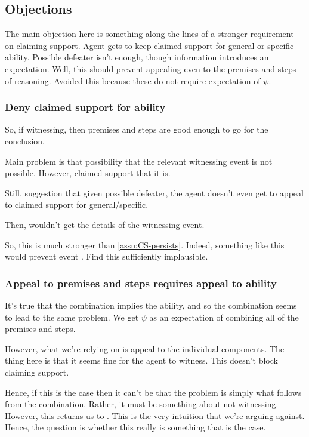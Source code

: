 \subsection{Objections}

\begin{note}
  The main objection here is something along the lines of a stronger requirement on claiming support.
  Agent gets to keep claimed support for general or specific ability.
  Possible defeater isn't enough, though information introduces an expectation.
  Well, this should prevent appealing even to the premises and steps of reasoning.
  Avoided this because these do not require expectation of \(\psi\).
\end{note}

\subsubsection{Deny claimed support for ability}

\begin{note}
  So, if witnessing, then premises and steps are good enough to go for the conclusion.

  Main problem is that possibility that the relevant witnessing event is not possible.
  However, claimed support that it is.

  Still, suggestion that given possible defeater, the agent doesn't even get to appeal to claimed support for general/specific.

  Then, wouldn't get the details of the witnessing event.

  So, this is much stronger than \autoref{assu:CS-persists}.
  Indeed, something like this would prevent event \ESU{}.
  Find this sufficiently implausible.
\end{note}

\subsubsection{Appeal to premises and steps requires appeal to ability}

\begin{note}
  It's true that the combination implies the ability, and so the combination seems to lead to the same problem.
  We get \(\psi\) as an expectation of combining all of the premises and steps.

  However, what we're relying on is appeal to the individual components.
  The thing here is that it seems fine for the agent to witness.
  This doesn't block claiming support.

  Hence, if this is the case then it can't be that the problem is simply what follows from the combination.
  Rather, it must be something about not witnessing.
  However, this returns us to \ESU{}.
  This is the very intuition that we're arguing against.
  Hence, the question is whether this really is something that is the case.
\end{note}

